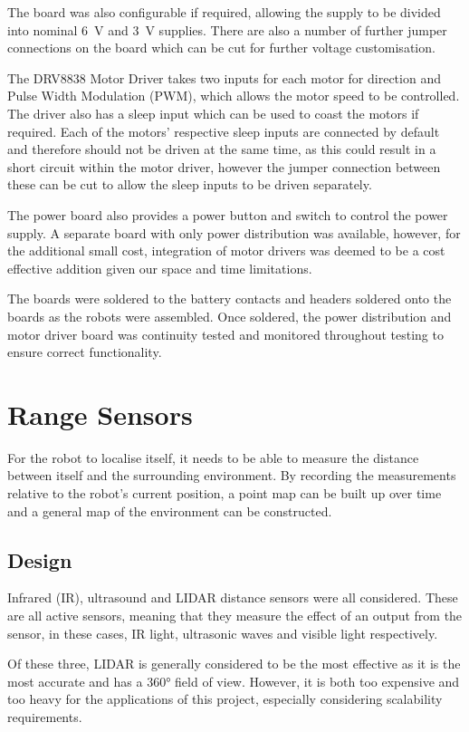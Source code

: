 The board was also configurable if required, allowing the supply to be
divided into nominal \SI{6}{\volt} and \SI{3}{\volt} supplies. There are also a number of further jumper
connections on the board which can be cut for further voltage customisation.

The DRV8838 Motor Driver takes two inputs for each motor for direction and Pulse
Width Modulation (PWM), which allows the motor speed to be controlled. The
driver also has a sleep input which can be used to coast the motors if
required. Each of the motors' respective sleep inputs are connected by default and therefore should not be driven at the same time,
as this could result in a short circuit within the motor driver, however the
jumper connection between these can be cut to allow the sleep inputs to
be driven separately.

The power board also provides a power button and switch to control the
power supply. A separate board with only power distribution was
available, however, for the additional small cost, integration of
motor drivers was deemed to be a cost effective addition given our
space and time limitations.

The boards were soldered to the battery contacts and headers soldered
onto the boards as the robots were assembled. Once soldered, the power
distribution and motor driver board was continuity tested and monitored 
throughout testing to ensure correct functionality.

\section{Range Sensors}\label{elec/range}
For the robot to localise itself, it needs to be able to measure the
distance between itself and the surrounding environment. By recording
the measurements relative to the robot's current position, a point map
can be built up over time and a general map of the environment can be
constructed.

\subsection{Design}\label{elec/range/design}
Infrared (IR), ultrasound and LIDAR distance sensors were all considered. These
are all active sensors, meaning that they measure the effect of an
output from the sensor, in these cases, IR light, ultrasonic waves
and visible light respectively.

Of these three, LIDAR is generally considered to be the most effective
as it is the most accurate and has a \ang{360} field of view. However,
it is both too expensive and too heavy for the applications of this project, especially
considering scalability requirements.

